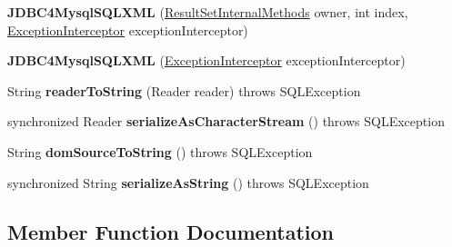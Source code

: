 \begin{DoxyCompactItemize}
\item 
\mbox{\label{classcom_1_1mysql_1_1jdbc_1_1_j_d_b_c4_mysql_s_q_l_x_m_l_afbeaac3ee85c13c38629061e04abc5ef}} 
{\bfseries J\+D\+B\+C4\+Mysql\+S\+Q\+L\+X\+ML} (\mbox{\hyperlink{interfacecom_1_1mysql_1_1jdbc_1_1_result_set_internal_methods}{Result\+Set\+Internal\+Methods}} owner, int index, \mbox{\hyperlink{interfacecom_1_1mysql_1_1jdbc_1_1_exception_interceptor}{Exception\+Interceptor}} exception\+Interceptor)
\item 
\mbox{\label{classcom_1_1mysql_1_1jdbc_1_1_j_d_b_c4_mysql_s_q_l_x_m_l_a26ab00142031b115c867686e7b945428}} 
{\bfseries J\+D\+B\+C4\+Mysql\+S\+Q\+L\+X\+ML} (\mbox{\hyperlink{interfacecom_1_1mysql_1_1jdbc_1_1_exception_interceptor}{Exception\+Interceptor}} exception\+Interceptor)
\item 
\mbox{\label{classcom_1_1mysql_1_1jdbc_1_1_j_d_b_c4_mysql_s_q_l_x_m_l_abf1edd80e5462415bf5f4b7a16d365ff}} 
String {\bfseries reader\+To\+String} (Reader reader)  throws S\+Q\+L\+Exception 
\item 
\mbox{\label{classcom_1_1mysql_1_1jdbc_1_1_j_d_b_c4_mysql_s_q_l_x_m_l_a799d1a55ca6f56dd8091548e3db1965b}} 
synchronized Reader {\bfseries serialize\+As\+Character\+Stream} ()  throws S\+Q\+L\+Exception 
\item 
\mbox{\label{classcom_1_1mysql_1_1jdbc_1_1_j_d_b_c4_mysql_s_q_l_x_m_l_a477b2b3c2739bc865d87882f036ca323}} 
String {\bfseries dom\+Source\+To\+String} ()  throws S\+Q\+L\+Exception 
\item 
\mbox{\label{classcom_1_1mysql_1_1jdbc_1_1_j_d_b_c4_mysql_s_q_l_x_m_l_ad5214285f4909f6eb517e8d64e7750bc}} 
synchronized String {\bfseries serialize\+As\+String} ()  throws S\+Q\+L\+Exception 
\end{DoxyCompactItemize}


\subsection{Member Function Documentation}
\mbox{\label{classcom_1_1mysql_1_1jdbc_1_1_j_d_b_c4_mysql_s_q_l_x_m_l_a5010a4a2deacccf75de0f11dc242be21}} 
